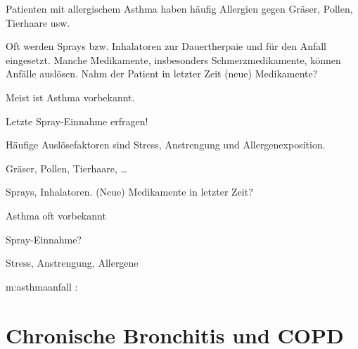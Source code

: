 {{\TxSAMPLER}}
{%
\begin{SAMPLERText}
  \item[\SAMPLER{A}] Patienten mit allergischem Asthma haben
  häufig Allergien gegen Gräser, Pollen, Tierhaare usw.
  \item[\SAMPLER{M}] Oft werden Sprays bzw. Inhalatoren zur
  Dauertherpaie und für den Anfall eingesetzt. Manche
  Medikamente, insbesonders Schmerzmedikamente, können
  Anfälle auslösen.%
  Nahm der Patient in letzter Zeit (neue)
  Medikamente?
  \item[\SAMPLER{P}] Meist ist Asthma vorbekannt. 
  \item[\SAMPLER{L}] Letzte Spray-Einnahme erfragen!
  \item[\SAMPLER{E}] Häufige Auslösefaktoren sind Stress,
  Anstrengung und Allergenexposition.
\end{SAMPLERText}
}
{
\begin{SAMPLERSlide}
  \item[\SAMPLER{A}] Gräser, Pollen, Tierhaare, \ldots
  \item[\SAMPLER{M}] Sprays, Inhalatoren. (Neue) Medikamente in letzter Zeit?
  \item[\SAMPLER{P}] Asthma oft vorbekannt
  \item[\SAMPLER{L}] Spray-Einnahme?
  \item[\SAMPLER{E}] Stress, Anstrengung, Allergene
\end{SAMPLERSlide}
}
{}
{}
{}




%     

{m:asthmaanfall}{
: 
 }{}


\section{Chronische
Bronchitis und COPD}
\label{topic:copd}
\nocite{Renz-Polster2006} 




